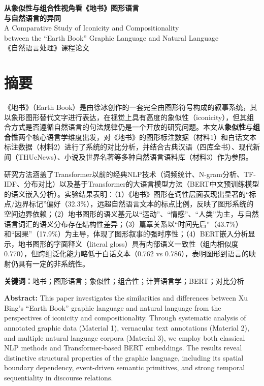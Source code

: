 \documentclass[a4paper,12pt]{article}
\begin{document}
\begin{titlepage}
\centering
\vspace*{2cm}
{\LARGE\bfseries\sffamily 从象似性与组合性视角看《地书》图形语言\\[0.3cm]与自然语言的异同}\\[1.5cm]
{\large A Comparative Study of Iconicity and Compositionality\\between the ``Earth Book'' Graphic Language and Natural Language}\\[2cm]
{\large 《自然语言处理》课程论文}\\[1cm]
\vspace{2cm}
\vfill
\vspace{1cm}
\end{titlepage}

\newpage
\section*{摘要}

《地书》（Earth Book）是由徐冰创作的一套完全由图形符号构成的叙事系统，其以象形图形替代文字进行表达，在视觉上具有高度的象似性（iconicity），但其组合方式是否遵循自然语言的句法规律仍是一个开放的研究问题。本文从\textbf{象似性}与\textbf{组合性}两个核心语言学维度出发，对《地书》的图形标注数据（材料1）和白话文本标注数据（材料2）进行了系统的对比分析，并结合古典汉语（四库全书）、现代新闻（THUcNews）、小说及世界名著等多种自然语言语料库（材料3）作为参照。

研究方法涵盖了Transformer以前的经典NLP技术（词频统计、N-gram分析、TF-IDF、分布对比）以及基于Transformer的大语言模型方法（BERT中文预训练模型的语义嵌入分析）。实验结果表明：（1）《地书》图形在词性层面表现出显著的``标点/边界标记''偏好（32.3\%），远超自然语言文本的标点比例，反映了图形系统的空间边界依赖；（2）地书图形的语义基元以``运动''、``情感''、``人类''为主，与自然语言词汇的语义分布存在结构性差异；（3）篇章关系以``时间先后''（43.7\%）和``因果''（17.9\%）为主导，体现了图形叙事的强时序性；（4）BERT嵌入分析显示，地书图形的字面释义（literal gloss）具有内部语义一致性（组内相似度0.770），但跨组泛化能力略低于白话文本（0.762 vs 0.786），表明图形到语言的映射仍具有一定的非系统性。

\textbf{关键词：}地书；图形语言；象似性；组合性；计算语言学；BERT；对比分析

\vspace{0.5cm}
\noindent\textbf{Abstract:} This paper investigates the similarities and differences between Xu Bing's ``Earth Book'' graphic language and natural language from the perspectives of iconicity and compositionality. Through systematic analysis of annotated graphic data (Material 1), vernacular text annotations (Material 2), and multiple natural language corpora (Material 3), we employ both classical NLP methods and Transformer-based BERT embeddings. The results reveal distinctive structural properties of the graphic language, including its spatial boundary dependency, event-driven semantic primitives, and strong temporal sequentiality in discourse relations.
\end{document}
